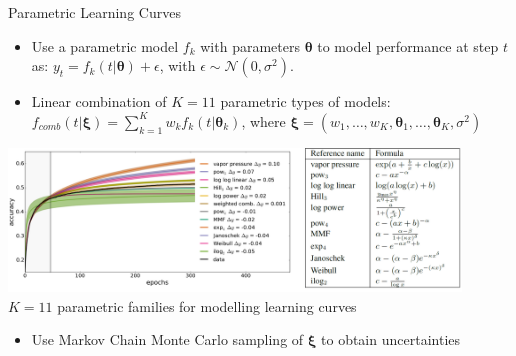 \begin{frame}{Parametric Learning Curves }

\vspace*{-0.25cm}
\begin{itemize}
	\item Use a parametric model $f_k$ with parameters $\boldsymbol{\theta}$ to model performance at step $t$ as:
	\alert{$y_t = f_k(t|\boldsymbol{\theta}) + \epsilon$}, with $\epsilon \sim \mathcal{N}(0, \sigma^2)$.
\pause
	\item Linear combination of $K=11$ parametric types of models:
	\alert{$f_{comb}(t|\bm{\xi}) = \sum_{k=1}^K w_k f_k(t|\boldsymbol{\theta}_k)$},
where $\bm{\xi} = (w_1, \dots, w_{K}, \boldsymbol{\theta}_1, \dots, \boldsymbol{\theta}_{K}, \sigma^2)$
\end{itemize}
\pause
\begin{center}
\includegraphics[width=0.9\textwidth]{../w07_hpo_speedup/images/learningcurve/Domhan_types_of_curves.png}\\
\scriptsize{$K=11$ parametric families for modelling learning curves}
\end{center}

\pause
\begin{itemize}
	\item Use Markov Chain Monte Carlo sampling of $\bm{\xi}$ to obtain uncertainties
\end{itemize}

\end{frame}

